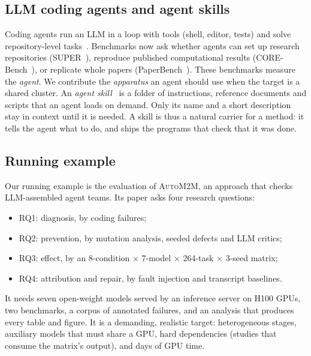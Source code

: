 \documentclass[pdflatex,sn-mathphys-num]{sn-jnl}
\theoremstyle{thmstyleone}%
\theoremstyle{thmstyletwo}%
\theoremstyle{thmstylethree}%
\newcommand{\auto}{\textsc{AutoM2M}}
\begin{document}
\subsection{LLM coding agents and agent skills}\label{sec:bg-agents}

Coding agents run an LLM in a loop with tools (shell, editor, tests) and solve
repository-level tasks~\cite{jimenez2024swebench,yang2024sweagent,wang2025openhands}.
Benchmarks now ask whether agents can set up research repositories
(SUPER~\cite{bogin2024super}), reproduce published computational results
(CORE-Bench~\cite{siegel2024corebench}), or replicate whole papers
(PaperBench~\cite{starace2025paperbench}). These benchmarks measure the
\emph{agent}. We contribute the \emph{apparatus} an agent should use when the
target is a shared cluster. An \emph{agent skill}~\cite{anthropic2025skills} is
a folder of instructions, reference documents and scripts that an agent loads
on demand. Only its name and a short description stay in context until it is
needed. A skill is thus a natural carrier for a method: it tells the agent what
to do, and ships the programs that check that it was done.

\subsection{Running example}\label{sec:example}

Our running example is the evaluation of \auto{}, an approach that checks
LLM-assembled agent teams. Its paper asks four research questions:
\begin{itemize}[leftmargin=1.4em, itemsep=1pt]
\item RQ1: diagnosis, by coding failures;
\item RQ2: prevention, by mutation analysis, seeded defects and LLM critics;
\item RQ3: effect, by an 8-condition $\times$ 7-model $\times$ 264-task
$\times$ 3-seed matrix;
\item RQ4: attribution and repair, by fault injection and transcript baselines.
\end{itemize}
It needs seven open-weight models served by an inference server on H100 GPUs,
two benchmarks, a corpus of annotated failures, and an analysis that produces
every table and figure. It is a demanding, realistic target: heterogeneous
stages, auxiliary models that must share a GPU, hard dependencies (studies that
consume the matrix's output), and days of GPU time.

\end{document}
